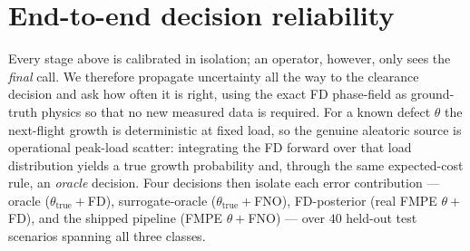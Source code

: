 \documentclass[11pt]{article}
\begin{document}
\section{End-to-end decision reliability}
Every stage above is calibrated in isolation; an operator, however, only sees
the \emph{final} call. We therefore propagate uncertainty all the way to the
clearance decision and ask how often it is right, using the exact FD
phase-field as ground-truth physics so that no new measured data is required.
For a known defect $\theta$ the next-flight growth is deterministic at fixed
load, so the genuine aleatoric source is operational peak-load scatter:
integrating the FD forward over that load distribution yields a true growth
probability and, through the same expected-cost rule, an \emph{oracle} decision.
Four decisions then isolate each error contribution --- oracle ($\theta_{\text{true}}{+}$FD),
surrogate-oracle ($\theta_{\text{true}}{+}$FNO), FD-posterior (real FMPE
$\theta{+}$FD), and the shipped pipeline (FMPE $\theta{+}$FNO) --- over $40$
held-out test scenarios spanning all three classes.
\end{document}
